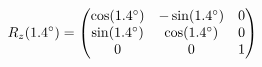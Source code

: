 \documentclass[preview]{standalone}
\begin{document}
\begin{align*}
\special{dvisvgm:raw <g id='unique000'>}R_z(1.4^\circ) = \begin{pmatrix} \cos(1.4^\circ) & -\sin(1.4^\circ) & 0 \\ \sin(1.4^\circ) & \cos(1.4^\circ) & 0 \\ 0 & 0 & 1 \end{pmatrix}\special{dvisvgm:raw </g>}
\end{align*}
\end{document}
